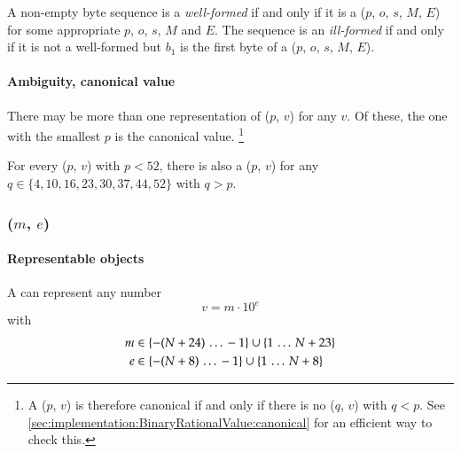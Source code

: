 A non-empty byte sequence  is a \emph{well-formed}
 if and only if
it is a ($p$, $o$, $s$, $M$, $E$) for some
appropriate $p$, $o$, $s$, $M$ and $E$.
The sequence is an \emph{ill-formed}  if and only if it is not a well-formed
 but $b_1$ is the first byte of a
($p$, $o$, $s$, $M$, $E$).

\paragraph{Ambiguity, canonical value}

There may be more than one representation of ($p$, $v$) for any $v$.
Of these, the one with the smallest $p$ is the canonical value.%
\footnote{
    A ($p$, $v$) is therefore canonical if and only if there is
    no ($q$, $v$) with $q < p$.
    See \ref{sec:implementation:BinaryRationalValue:canonical} for an efficient way to check this.
}

For every ($p$, $v$) with $p < 52$, there is also
a ($p$, $v$) for any
$q \in \{4, 10, 16, 23, 30, 37, 44, 52\}$ with $q > p$.


\subsubsection{($m$, $e$)}
\hypertarget{sec:def:DecimalRationalValue}{}

\paragraph{Representable objects}

A  can represent any number
\begin{equation}
    v = m \cdot 10^e
\end{equation}
with
\begin{align*}
    m & \in \{-(N + 24) \,\ldots\, -1\} \cup \{1 \,\ldots\, N + 23\} \\
    e & \in \{-(N + 8) \,\ldots\, -1\} \cup \{1 \,\ldots\, N + 8\}
\end{align*}

